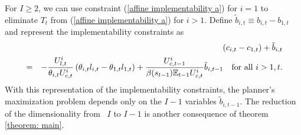 \documentclass[thmsb,11pt]{article}
\begin{document}
\noindent For $I\geq 2$, we can use constraint (\ref{affine implementability
a}) for  $i=1$ to eliminate $T_{t}$ from (\ref{affine implementability a}) for $i > 1$. Define $\tilde{b}%
_{i,t}\equiv b_{i,t}-b_{1,t}$ and represent the implementability constraints
as
\begin{eqnarray}
&&\left( c_{i,t}-c_{1,t}\right) +\tilde{b}_{i,t}
\label{affine implementability b} \\
&=&-\frac{U_{l,t}^{i}}{\theta _{i,t}U_{c,t}^{i}}\left( \theta
_{i,t}l_{i,t}-\theta _{1,t}l_{1,t}\right) +\frac{U_{c,t-1}^{i}}{\beta(s_{t-1}) \mathbb{E}%
_{t-1}U_{c,t}^{i}}\tilde{b}_{i,t-1}\ \text{for\ all\ }i>1,t.  \notag
\end{eqnarray}%
\smallskip With this representation of the implementability constraints, the planner's
maximization problem depends only on the $I-1$ variables $\tilde{b}_{i,t-1}.$
The reduction of  the dimensionality from \ $I$ to $I-1$ is
 another consequence of theorem \ref{theorem: main}.
\end{document}
